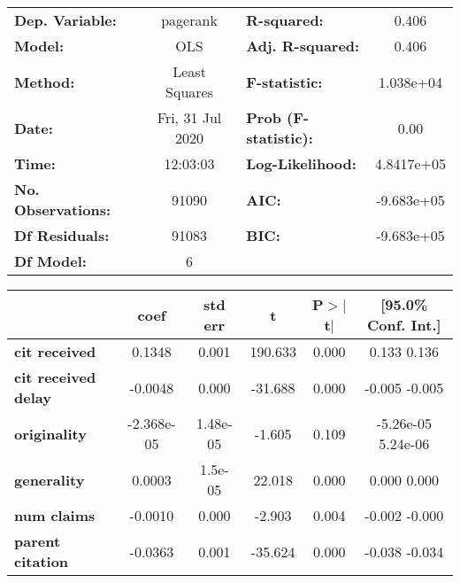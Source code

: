 \begin{center}
\begin{tabular}{lclc}
\toprule
\textbf{Dep. Variable:}     &     pagerank     & \textbf{  R-squared:         } &       0.406    \\
\textbf{Model:}             &       OLS        & \textbf{  Adj. R-squared:    } &       0.406    \\
\textbf{Method:}            &  Least Squares   & \textbf{  F-statistic:       } &   1.038e+04    \\
\textbf{Date:}              & Fri, 31 Jul 2020 & \textbf{  Prob (F-statistic):} &       0.00     \\
\textbf{Time:}              &     12:03:03     & \textbf{  Log-Likelihood:    } &   4.8417e+05   \\
\textbf{No. Observations:}  &       91090      & \textbf{  AIC:               } &   -9.683e+05   \\
\textbf{Df Residuals:}      &       91083      & \textbf{  BIC:               } &   -9.683e+05   \\
\textbf{Df Model:}          &           6      & \textbf{                     } &                \\
\bottomrule
\end{tabular}
\begin{tabular}{lccccc}
                            & \textbf{coef} & \textbf{std err} & \textbf{t} & \textbf{P$>$$|$t$|$} & \textbf{[95.0\% Conf. Int.]}  \\
\midrule
\textbf{cit received}       &       0.1348  &        0.001     &   190.633  &         0.000        &         0.133     0.136       \\
\textbf{cit received delay} &      -0.0048  &        0.000     &   -31.688  &         0.000        &        -0.005    -0.005       \\
\textbf{originality}        &   -2.368e-05  &     1.48e-05     &    -1.605  &         0.109        &     -5.26e-05  5.24e-06       \\
\textbf{generality}         &       0.0003  &      1.5e-05     &    22.018  &         0.000        &         0.000     0.000       \\
\textbf{num claims}         &      -0.0010  &        0.000     &    -2.903  &         0.004        &        -0.002    -0.000       \\
\textbf{parent citation}    &      -0.0363  &        0.001     &   -35.624  &         0.000        &        -0.038    -0.034       \\

\end{tabular}
\end{center}
